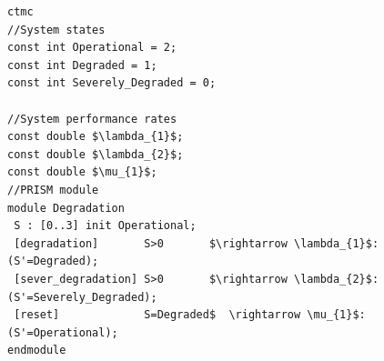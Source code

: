 
\begin{figure}[!htb]
\begin{minipage}{12.3cm}
\begin{lstlisting}[style=framed,
	caption=The System Status Over Execution Time,
 	label=exampleinprismtest]
ctmc    
//System states
const int Operational = 2;
const int Degraded = 1;
const int Severely_Degraded = 0;

//System performance rates
const double $\lambda_{1}$;
const double $\lambda_{2}$;
const double $\mu_{1}$;
//PRISM module
module Degradation
 S : [0..3] init Operational;
 [degradation]       S>0       $\rightarrow \lambda_{1}$:(S'=Degraded); 
 [sever_degradation] S>0       $\rightarrow \lambda_{2}$:(S'=Severely_Degraded); 
 [reset]             S=Degraded$  \rightarrow \mu_{1}$:(S'=Operational); 
endmodule

\end{lstlisting}
\end{minipage}
\end{figure}
